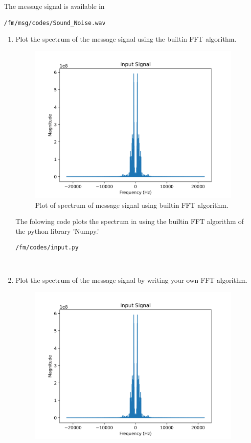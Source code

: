 The message signal is available in 
\begin{lstlisting}
/fm/msg/codes/Sound_Noise.wav
\end{lstlisting}
\begin{enumerate}[label=\arabic*.,ref=\thesection.\theenumi]
\item Plot the spectrum of the message signal using the builtin FFT algorithm.\\
	\solution		
\begin{figure}[H]
\centering
\includegraphics[width=\columnwidth]{fm/msg/figs/FFTbuiltin/inputs-1.png}
\caption{Plot of spectrum of message signal using builtin FFT algorithm.}
\label{fig:FFTb}
\end{figure}
The folowing code plots the spectrum in  using the builtin FFT algorithm of the python library 'Numpy.'
\begin{lstlisting}
/fm/codes/input.py
\end{lstlisting}
\\
\item Plot the spectrum of the message signal by writing your own FFT algorithm.
	\\
	\solution
		\begin{figure}[H]
		\centering
		\includegraphics[width=\columnwidth]{fm/msg/figs/FFTown/input2.png}

\end{figure}
\end{enumerate}
